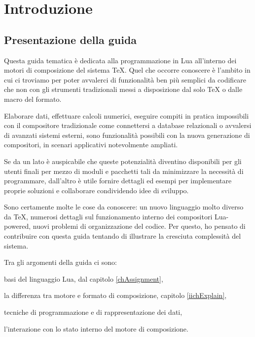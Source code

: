 

\chapter{Introduzione}

\section{Presentazione della guida}

Questa guida tematica è dedicata alla programmazione in Lua all'interno dei
motori di composizione del sistema \TeX. Quel che occorre conoscere è l'ambito
in cui ci troviamo per poter avvalerci di funzionalità ben più semplici da
codificare che non con gli strumenti tradizionali messi a disposizione dal solo
\TeX{} o dalle macro del formato.

Elaborare dati, effettuare calcoli numerici, eseguire compiti in pratica
impossibili con il compositore tradizionale come connettersi a database
relazionali o avvalersi di avanzati sistemi esterni, sono funzionalità
possibili con la nuova generazione di compositori, in scenari applicativi
notevolmente ampliati.

Se da un lato è auspicabile che queste potenzialità diventino disponibili per
gli utenti finali per mezzo di moduli e pacchetti tali da minimizzare la
necessità di programmare, dall'altro è utile fornire dettagli ed esempi per
implementare proprie soluzioni e collaborare condividendo idee di sviluppo.

Sono certamente molte le cose da conoscere: un nuovo linguaggio molto diverso da
\TeX{}, numerosi dettagli sul funzionamento interno dei compositori Lua-powered,
nuovi problemi di organizzazione del codice. Per questo, ho pensato di
contribuire con questa guida tentando di illustrare la cresciuta complessità del
sistema.

Tra gli argomenti della guida ci sono:
\begin{compactitemize}
\item basi del linguaggio Lua, dal capitolo \ref{chAssignment},
\item la differenza tra motore e formato di composizione, capitolo \ref{iichExplain},
\item tecniche di programmazione e di rappresentazione dei dati,
\item l'interazione con lo stato interno del motore di composizione.
\end{compactitemize}

